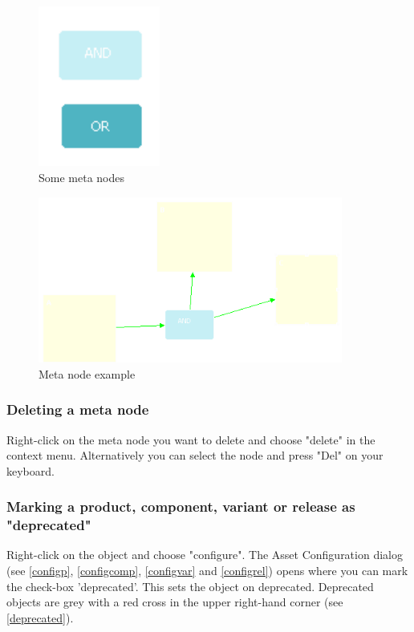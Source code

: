 \begin{figure}[h!]
\begin{center}
\includegraphics[width=4cm]{metanode.png}
   \caption{Some meta nodes}
\label{meta}
\end{center}
\end{figure}\par

\begin{figure}[h!]
\begin{center}
\includegraphics[width=10cm]{example.png}
   \caption{Meta node example}
\label{example}
\end{center}
\end{figure}\par

\subsubsection{Deleting a meta node}

Right-click on the meta node you want to delete and choose "delete" in the context
menu. Alternatively you
can select the node and press "Del" on your keyboard.

\subsubsection{Marking a product, component, variant or release as "deprecated"}
Right-click on the object and choose "configure". The Asset Configuration dialog (see \ref{configp}, \ref{configcomp}, \ref{configvar} and \ref{configrel}) opens where you can
mark the check-box 'deprecated'. This sets the object on deprecated. Deprecated objects are grey with a 
red cross in the upper right-hand corner (see \ref{deprecated}).

